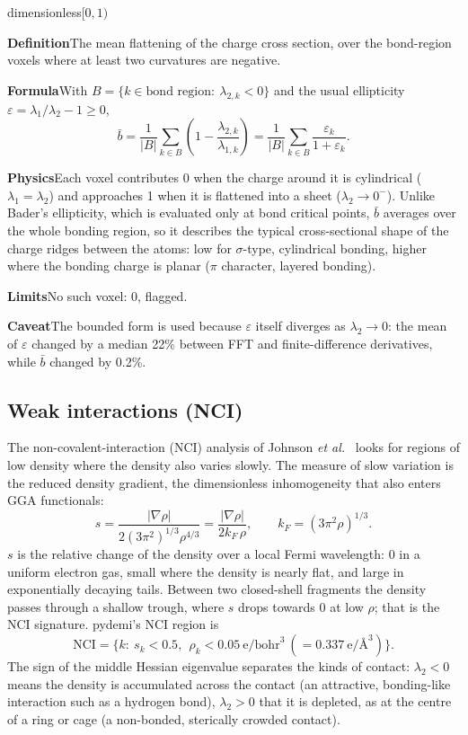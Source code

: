 \documentclass[11pt,a4paper]{article}
\newcommand{\dn}[1]{\texttt{\detokenize{#1}}}
\newcommand{\desc}[3]{\par\needspace{7\baselineskip}\vspace{1.3ex}%
  \phantomsection\label{d:#1}%
  \noindent\parbox[t]{0.68\linewidth}{\raggedright\color{MidnightBlue}\large\bfseries\dn{#2}}%
  \hfill\parbox[t]{0.30\linewidth}{\raggedleft\small\color{black!60}#3}\par
  \vspace{-0.5ex}{\color{MidnightBlue!35}\hrule height 0.5pt}\vspace{0.5ex}}
\newcommand{\lab}[1]{{\small\sffamily\bfseries\color{MidnightBlue}#1}\enspace}
\newcommand{\Def}{\par\lab{Definition}}
\newcommand{\Frm}{\par\lab{Formula}}
\newcommand{\Phy}{\par\lab{Physics}}
\newcommand{\Lim}{\par\lab{Limits}}
\newcommand{\Cav}{\par\lab{Caveat}}
\begin{document}
\desc{ellip_bond_bounded_avg}{ellip_bond_bounded_avg}{dimensionless\quad$[0,1)$}
\Def The mean flattening of the charge cross section, over the bond-region voxels where at least two
curvatures are negative.
\Frm With $B=\{k\in\text{bond region}:\ \lambda_{2,k}<0\}$ and the usual ellipticity
$\varepsilon=\lambda_1/\lambda_2-1\ge0$,
\[
\bar b=\frac{1}{|B|}\sum_{k\in B}\left(1-\frac{\lambda_{2,k}}{\lambda_{1,k}}\right)
      =\frac{1}{|B|}\sum_{k\in B}\frac{\varepsilon_k}{1+\varepsilon_k}.
\]
\Phy Each voxel contributes 0 when the charge around it is cylindrical ($\lambda_1=\lambda_2$) and
approaches 1 when it is flattened into a sheet ($\lambda_2\to0^-$). Unlike Bader's ellipticity,
which is evaluated only at bond critical points, $\bar b$ averages over the whole bonding region,
so it describes the typical cross-sectional shape of the charge ridges between the atoms: low for
$\sigma$-type, cylindrical bonding, higher where the bonding charge is planar ($\pi$ character,
layered bonding).
\Lim No such voxel: 0, flagged.
\Cav The bounded form is used because $\varepsilon$ itself diverges as $\lambda_2\to0$: the mean of
$\varepsilon$ changed by a median 22\% between FFT and finite-difference derivatives, while $\bar b$
changed by 0.2\%.

\subsection{Weak interactions (NCI)}
The non-covalent-interaction (NCI) analysis of Johnson \emph{et al.}~\cite{nci} looks for regions of
low density where the density also varies slowly. The measure of slow variation is the reduced
density gradient, the dimensionless inhomogeneity that also enters GGA functionals:
\[
s=\frac{|\nabla\rho|}{2(3\pi^2)^{1/3}\rho^{4/3}}=\frac{|\nabla\rho|}{2k_F\,\rho},\qquad k_F=(3\pi^2\rho)^{1/3}.
\]
$s$ is the relative change of the density over a local Fermi wavelength: $0$ in a uniform electron
gas, small where the density is nearly flat, and large in exponentially decaying tails. Between two
closed-shell fragments the density passes through a shallow trough, where $s$ drops towards 0 at low
$\rho$; that is the NCI signature. pydemi's NCI region is
\[
\mathrm{NCI}=\{k:\ s_k<0.5,\ \ \rho_k<0.05\ \text{e/bohr}^3\ (=0.337\ \text{e/\AA}^3)\}.
\]
The sign of the middle Hessian eigenvalue separates the kinds of contact: $\lambda_2<0$ means the
density is accumulated across the contact (an attractive, bonding-like interaction such as a
hydrogen bond), $\lambda_2>0$ that it is depleted, as at the centre of a ring or cage (a
non-bonded, sterically crowded contact).
\end{document}
